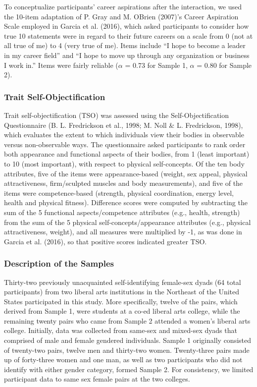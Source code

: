 \documentclass[man]{apa6}
\begin{document}
To conceptualize participants' career aspirations after the interaction,
we used the 10-item adaptation of P. Gray and M. OBrien (2007)'s Career
Aspiration Scale employed in Garcia et al. (2016), which asked
participants to consider how true 10 statements were in regard to their
future careers on a scale from 0 (not at all true of me) to 4 (very true
of me). Items include \enquote{I hope to become a leader in my career
field} and \enquote{I hope to move up through any organization or
business I work in.} Items were fairly reliable (\(\alpha\) = 0.73 for
Sample 1, \(\alpha\) = 0.80 for Sample 2).

\subsubsection{Trait
Self-Objectification}\label{trait-self-objectification}

Trait self-objectification (TSO) was assessed using the
Self-Objectification Questionnaire (B. L. Fredrickson et al., 1998; M.
Noll \& L. Fredrickson, 1998), which evaluates the extent to which
individuals view their bodies in observable versus non-observable ways.
The questionnaire asked participants to rank order both appearance and
functional aspects of their bodies, from 1 (least important) to 10 (most
important), with respect to physical self-concepts. Of the ten body
attributes, five of the items were appearance-based (weight, sex appeal,
physical attractiveness, firm/sculpted muscles and body measurements),
and five of the items were competence-based (strength, physical
coordination, energy level, health and physical fitness). Difference
scores were computed by subtracting the sum of the 5 functional
aspects/competence attributes (e.g., health, strength) from the sum of
the 5 physical self-concepts/appearance attributes (e.g., physical
attractiveness, weight), and all measures were multiplied by -1, as was
done in Garcia et al. (2016), so that positive scores indicated greater
TSO.

\subsubsection{Description of the
Samples}\label{description-of-the-samples}

Thirty-two previously unacquainted self-identifying female-sex dyads (64
total participants) from two liberal arts institutions in the Northeast
of the United States participated in this study. More specifically,
twelve of the pairs, which derived from Sample 1, were students at a
co-ed liberal arts college, while the remaining twenty pairs who came
from Sample 2 attended a women's liberal arts college. Initially, data
was collected from same-sex and mixed-sex dyads that comprised of male
and female gendered individuals. Sample 1 originally consisted of
twenty-two pairs, twelve men and thirty-two women. Twenty-three pairs
made up of forty-three women and one man, as well as two participants
who did not identify with either gender category, formed Sample 2. For
consistency, we limited participant data to same sex female pairs at the
two colleges.
\end{document}

